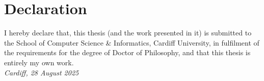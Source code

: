\chapter*{Declaration}
I hereby declare that, this thesis (and the work presented in it) is submitted to the School of Computer Science \& Informatics, Cardiff University, in fulfilment of the requirements for the degree of Doctor of Philosophy, and that this thesis is entirely my own work. 
\\[30pt]

\noindent\textit{Cardiff, 28 August 2025}
\\[70pt]
\rightline{\rule[0.07\baselineskip]{0.3\textwidth}{0.3pt}}


